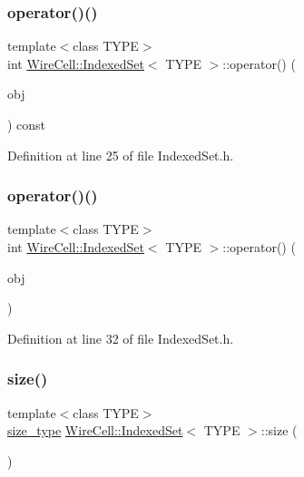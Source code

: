 \subsubsection{\texorpdfstring{operator()()}{operator()()}\hspace{0.1cm}{\footnotesize\ttfamily [1/2]}}
{\footnotesize\ttfamily template$<$class T\+Y\+PE$>$ \\
int \hyperlink{class_wire_cell_1_1_indexed_set}{Wire\+Cell\+::\+Indexed\+Set}$<$ T\+Y\+PE $>$\+::operator() (\begin{DoxyParamCaption}\item[{const T\+Y\+PE \&}]{obj }\end{DoxyParamCaption}) const\hspace{0.3cm}{\ttfamily [inline]}}



Definition at line 25 of file Indexed\+Set.\+h.

\mbox{\label{class_wire_cell_1_1_indexed_set_ad42f0e95a68eae037f9b4687c3948009}} 
\subsubsection{\texorpdfstring{operator()()}{operator()()}\hspace{0.1cm}{\footnotesize\ttfamily [2/2]}}
{\footnotesize\ttfamily template$<$class T\+Y\+PE$>$ \\
int \hyperlink{class_wire_cell_1_1_indexed_set}{Wire\+Cell\+::\+Indexed\+Set}$<$ T\+Y\+PE $>$\+::operator() (\begin{DoxyParamCaption}\item[{const T\+Y\+PE \&}]{obj }\end{DoxyParamCaption})\hspace{0.3cm}{\ttfamily [inline]}}



Definition at line 32 of file Indexed\+Set.\+h.

\mbox{\label{class_wire_cell_1_1_indexed_set_a0c8ab3f7c64d74b83677c2891356de93}} 
\subsubsection{\texorpdfstring{size()}{size()}}
{\footnotesize\ttfamily template$<$class T\+Y\+PE$>$ \\
\hyperlink{class_wire_cell_1_1_indexed_set_a0b1e1cffb974f20a89cd9d7cd744d89c}{size\+\_\+type} \hyperlink{class_wire_cell_1_1_indexed_set}{Wire\+Cell\+::\+Indexed\+Set}$<$ T\+Y\+PE $>$\+::size (\begin{DoxyParamCaption}{ }\end{DoxyParamCaption})\hspace{0.3cm}{\ttfamily [inline]}}




